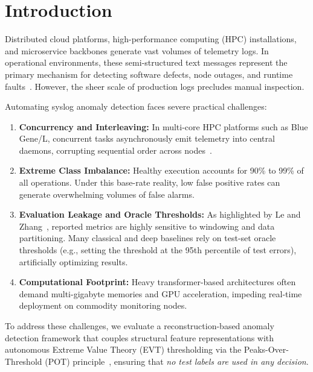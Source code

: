 \documentclass[conference]{IEEEtran}
\begin{document}
\section{Introduction}
\label{sec:intro}
Distributed cloud platforms, high-performance computing (HPC) installations, and microservice backbones generate vast volumes of telemetry logs. In operational environments, these semi-structured text messages represent the primary mechanism for detecting software defects, node outages, and runtime faults~\cite{oliner2007supercomputer,xu2009detecting}. However, the sheer scale of production logs precludes manual inspection.

Automating syslog anomaly detection faces severe practical challenges:
\begin{enumerate}
    \item \textbf{Concurrency and Interleaving:} In multi-core HPC platforms such as Blue Gene/L, concurrent tasks asynchronously emit telemetry into central daemons, corrupting sequential order across nodes~\cite{oliner2007supercomputer}.
    \item \textbf{Extreme Class Imbalance:} Healthy execution accounts for 90\% to 99\% of all operations. Under this base-rate reality, low false positive rates can generate overwhelming volumes of false alarms.
    \item \textbf{Evaluation Leakage and Oracle Thresholds:} As highlighted by Le and Zhang~\cite{le2022log}, reported metrics are highly sensitive to windowing and data partitioning. Many classical and deep baselines rely on test-set oracle thresholds (e.g., setting the threshold at the 95th percentile of test errors), artificially optimizing results.
    \item \textbf{Computational Footprint:} Heavy transformer-based architectures often demand multi-gigabyte memories and GPU acceleration, impeding real-time deployment on commodity monitoring nodes.
\end{enumerate}

To address these challenges, we evaluate a reconstruction-based anomaly detection framework that couples structural feature representations with autonomous Extreme Value Theory (EVT) thresholding via the Peaks-Over-Threshold (POT) principle~\cite{siffer2017anomaly}, ensuring that \textit{no test labels are used in any decision}.
\end{document}
